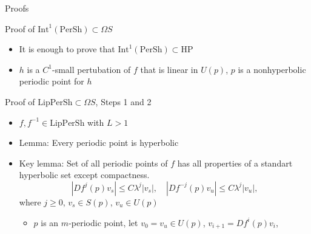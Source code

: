 \documentclass{beamer}
\begin{document}
\begin{section}{Proofs}
\begin{frame}{Proof of $\mbox{Int}^1(\mbox{PerSh})\subset\Omega S$}
\begin{itemize}
	Lemma (Aoki, 1992, Hayashi, 1992). $\mbox{Int}^1(\mbox{HP})=\Omega S$
	\item It is enough to prove that $\mbox{Int}^1(\mbox{PerSh})\subset\mbox{HP}$
	\item %
	$h$ is a $C^1$-small pertubation of $f$ that is linear in $U(p)$, $p$ is a nonhyperbolic periodic point for $h$
\end{itemize}
\end{frame}
\begin{frame}{Proof of $\mbox{LipPerSh}\subset\Omega S$, Steps 1 and 2}
\begin{itemize}
\item $f, f^{-1}\in\mbox{LipPerSh}$ with $L>1$
\item Lemma: Every periodic point is hyperbolic
\item Key lemma: Set of all periodic points of $f$ has all properties of a standart hyperbolic set except compactness.
$$|Df^j(p)v_s|\leq C\lambda^j|v_s|,\quad |Df^{-j}(p)v_u|\leq C\lambda^j|v_u|,$$ where $j\geq0$, $v_s\in S(p)$, $v_u\in U(p)$
\begin{itemize}
\item $p$ is an $m$-periodic point, let $v_0=v_u\in U(p)$, $v_{i+1}=Df^i(p)v_i$, 

\end{itemize}
\end{itemize}
\end{frame}
\end{section}
\end{document}
